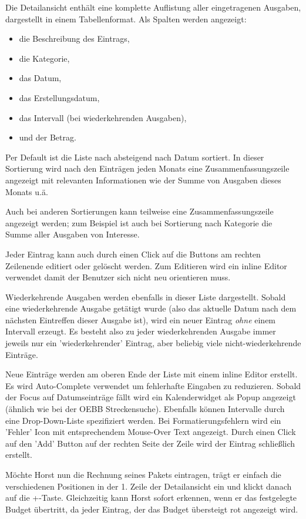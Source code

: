 Die Detailansicht enthält eine komplette Auflistung aller eingetragenen Ausgaben, dargestellt
in einem Tabellenformat. Als Spalten werden angezeigt:

\begin{itemize}
    \item die Beschreibung des Eintrags,
    \item die Kategorie,
    \item das Datum,
    \item das Erstellungsdatum,
    \item das Intervall (bei wiederkehrenden Ausgaben),
    \item und der Betrag.
\end{itemize}

Per Default ist die Liste nach absteigend nach Datum sortiert. In dieser Sortierung wird nach den
Einträgen jeden Monats eine Zusammenfassungszeile angezeigt mit relevanten Informationen wie der Summe von Ausgaben dieses Monats u.ä.

Auch bei anderen Sortierungen kann teilweise eine Zusammenfassungszeile angezeigt werden; zum Beispiel ist auch
bei Sortierung nach Kategorie die Summe aller Ausgaben von Interesse.

Jeder Eintrag kann auch durch einen Click auf die Buttons am rechten Zeilenende editiert oder gelöscht werden.
Zum Editieren wird ein inline Editor verwendet damit der Benutzer sich nicht neu orientieren muss.

Wiederkehrende Ausgaben werden ebenfalls in dieser Liste dargestellt. Sobald eine wiederkehrende Ausgabe getätigt wurde
(also das aktuelle Datum nach dem nächsten Eintreffen dieser Ausgabe ist), wird ein neuer Eintrag \emph{ohne} einem Intervall
erzeugt. Es besteht also zu jeder wiederkehrenden Ausgabe immer jeweils nur ein 'wiederkehrender' Eintrag, aber beliebig viele
nicht-wiederkehrende Einträge.

Neue Einträge werden am oberen Ende der Liste mit einem inline Editor erstellt. Es wird Auto-Complete verwendet um fehlerhafte
Eingaben zu reduzieren. Sobald der Focus auf Datumseinträge fällt wird ein Kalenderwidget als Popup angezeigt (ähnlich wie bei der
OEBB Streckensuche). Ebenfalls können Intervalle durch eine Drop-Down-Liste spezifiziert werden. Bei Formatierungsfehlern wird ein 'Fehler' Icon mit entsprechendem Mouse-Over Text angezeigt. Durch einen Click
auf den 'Add' Button auf der rechten Seite der Zeile wird der Eintrag
schließlich erstellt.

M\"ochte Horst nun die Rechnung seines Pakets eintragen, trägt er einfach die
verschiedenen Positionen in der 1. Zeile der Detailansicht ein und klickt danach
auf die \glqq +\grqq-Taste. Gleichzeitig kann Horst sofort erkennen, wenn er das
festgelegte Budget \"ubertritt, da jeder Eintrag, der das Budget übersteigt
rot angezeigt wird.

